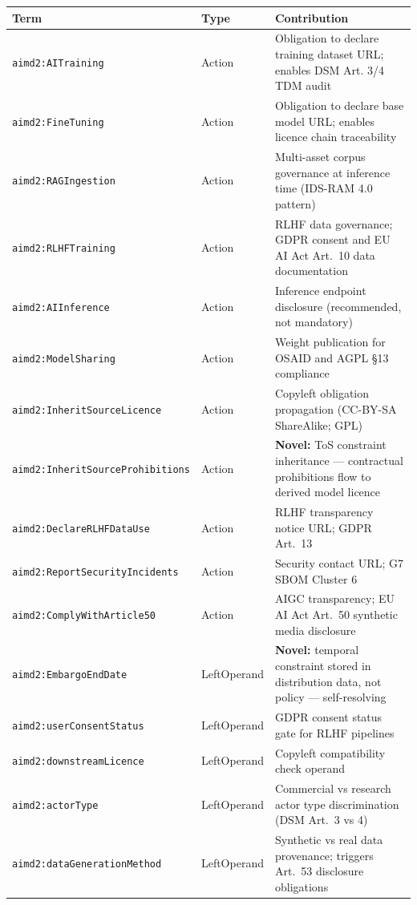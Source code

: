 \documentclass[12pt,a4paper]{article}
\begin{document}
\begin{longtable}{@{}p{5.5cm}p{2.5cm}p{6.0cm}@{}}
\toprule
\textbf{Term} & \textbf{Type} & \textbf{Contribution} \\
\midrule
\endhead
\texttt{aimd2:AITraining}           & Action & Obligation to declare training dataset URL; enables DSM Art. 3/4 TDM audit \\
\texttt{aimd2:FineTuning}           & Action & Obligation to declare base model URL; enables licence chain traceability \\
\texttt{aimd2:RAGIngestion}         & Action & Multi-asset corpus governance at inference time (IDS-RAM 4.0 pattern) \\
\texttt{aimd2:RLHFTraining}         & Action & RLHF data governance; GDPR consent and EU AI Act Art.\ 10 data documentation \\
\texttt{aimd2:AIInference}          & Action & Inference endpoint disclosure (recommended, not mandatory) \\
\texttt{aimd2:ModelSharing}         & Action & Weight publication for OSAID and AGPL \S 13 compliance \\
\texttt{aimd2:InheritSourceLicence}  & Action & Copyleft obligation propagation (CC-BY-SA ShareAlike; GPL) \\
\texttt{aimd2:InheritSourceProhibitions} & Action & \textbf{Novel:} ToS constraint inheritance — contractual prohibitions flow to derived model licence \\
\texttt{aimd2:DeclareRLHFDataUse}   & Action & RLHF transparency notice URL; GDPR Art.\ 13 \\
\texttt{aimd2:ReportSecurityIncidents} & Action & Security contact URL; G7 SBOM Cluster 6 \\
\texttt{aimd2:ComplyWithArticle50}  & Action & AIGC transparency; EU AI Act Art.\ 50 synthetic media disclosure \\[4pt]
\texttt{aimd2:EmbargoEndDate}       & LeftOperand & \textbf{Novel:} temporal constraint stored in distribution data, not policy — self-resolving \\
\texttt{aimd2:userConsentStatus}    & LeftOperand & GDPR consent status gate for RLHF pipelines \\
\texttt{aimd2:downstreamLicence}    & LeftOperand & Copyleft compatibility check operand \\
\texttt{aimd2:actorType}            & LeftOperand & Commercial vs research actor type discrimination (DSM Art.\ 3 vs 4) \\
\texttt{aimd2:dataGenerationMethod} & LeftOperand & Synthetic vs real data provenance; triggers Art.\ 53 disclosure obligations \\

\end{longtable}
\end{document}
